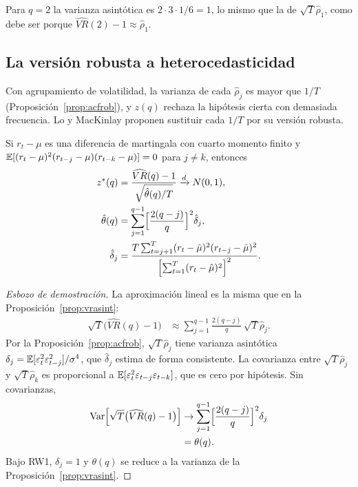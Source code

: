 Para $q=2$ la varianza asintótica es $2\cdot3\cdot1/6=1$, lo mismo que la de $\sqrt T\hat\rho_1$, como debe
ser porque $\widehat{VR}(2)-1\approx\hat\rho_1$.

\subsection{La versión robusta a heterocedasticidad}

Con agrupamiento de volatilidad, la varianza de cada $\hat\rho_j$ es mayor que $1/T$
(Proposición~\ref{prop:acfrob}), y $z(q)$ rechaza la hipótesis cierta con demasiada frecuencia. Lo y MacKinlay
proponen sustituir cada $1/T$ por su versión robusta.

\begin{proposicion}\label{prop:vrrob}
Si $r_t-\mu$ es una diferencia de martingala con cuarto momento finito y
$\mathbb{E}[(r_t-\mu)^2(r_{t-j}-\mu)(r_{t-k}-\mu)]=0$ para $j\ne k$, entonces
\begin{align*}
  z^*(q) &= \frac{\widehat{VR}(q)-1}{\sqrt{\hat\theta(q)/T}}\xrightarrow{d}N(0,1),\\
  \hat\theta(q) &= \sum_{j=1}^{q-1}\Bigl[\frac{2(q-j)}{q}\Bigr]^2\hat\delta_j,\\
  \hat\delta_j &= \frac{T\sum_{t=j+1}^{T}(r_t-\hat\mu)^2(r_{t-j}-\hat\mu)^2}
                     {\Bigl[\sum_{t=1}^{T}(r_t-\hat\mu)^2\Bigr]^2}.
\end{align*}
\end{proposicion}

\begin{proof}[Esbozo de demostración]
La aproximación lineal es la misma que en la Proposición~\ref{prop:vrasint}:
\begin{align*}
  \sqrt T\bigl(\widehat{VR}(q)-1\bigr) &\approx \sum_{j=1}^{q-1}\frac{2(q-j)}{q}\,\sqrt T\hat\rho_j .
\end{align*}
Por la Proposición~\ref{prop:acfrob}, $\sqrt T\hat\rho_j$ tiene varianza asintótica
$\delta_j=\mathbb{E}[\varepsilon_t^2\varepsilon_{t-j}^2]/\sigma^4$, que $\hat\delta_j$ estima de forma consistente. La
covarianza entre $\sqrt T\hat\rho_j$ y $\sqrt T\hat\rho_k$ es proporcional a
$\mathbb{E}[\varepsilon_t^2\varepsilon_{t-j}\varepsilon_{t-k}]$, que es cero por hipótesis. Sin covarianzas,
\begin{align*}
  \operatorname{Var}\Bigl[\sqrt T\bigl(\widehat{VR}(q)-1\bigr)\Bigr]
     &\to \sum_{j=1}^{q-1}\Bigl[\frac{2(q-j)}{q}\Bigr]^2\delta_j\\
     &= \theta(q).
\end{align*}
Bajo RW1, $\delta_j=1$ y $\theta(q)$ se reduce a la varianza de la Proposición~\ref{prop:vrasint}.
\end{proof}

